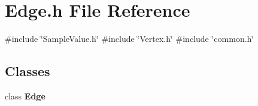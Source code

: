 \section{Edge.\+h File Reference}
\label{Edge_8h}
{\ttfamily \#include \char`\"{}Sample\+Value.\+h\char`\"{}}\newline
{\ttfamily \#include \char`\"{}Vertex.\+h\char`\"{}}\newline
{\ttfamily \#include \char`\"{}common.\+h\char`\"{}}\newline
\subsection*{Classes}
\begin{DoxyCompactItemize}
\item 
class \textbf{ Edge}
\end{DoxyCompactItemize}
